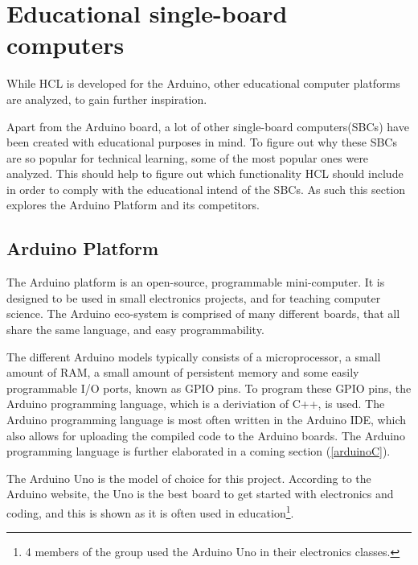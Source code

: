 \section{Educational single-board computers}
While HCL is developed for the Arduino, other educational computer platforms are analyzed, to gain further inspiration.

Apart from the Arduino board, a lot of other single-board computers(SBCs) have been created with educational purposes in mind.
To figure out why these SBCs are so popular for technical learning, some of the most popular ones were analyzed.
This should help to figure out which functionality HCL should include in order to comply with the educational intend of the SBCs\cite{SBC}.
As such this section explores the Arduino Platform and its competitors.

\subsection{Arduino Platform}
The Arduino platform is an open-source, programmable mini-computer\cite{ArFAQ}.
It is designed to be used in small electronics projects, and for teaching computer science.
The Arduino eco-system is comprised of many different boards, that all share the same language, and easy programmability.

The different Arduino models typically consists of a microprocessor, a small amount of RAM, a small amount of persistent memory and some easily programmable I/O ports, known as GPIO pins.
To program these GPIO pins, the Arduino programming language, which is a deriviation of C++, is used.
The Arduino programming language is most often written in the Arduino IDE, which also allows for uploading the compiled code to the Arduino boards.
The Arduino programming language is further elaborated in a coming section (\ref{arduinoC}).

The Arduino Uno is the model of choice for this project.
According to the Arduino website, the Uno is the best board to get started with electronics and coding, and this is shown as it is often used in education\footnote{4 members of the group used the Arduino Uno in their electronics classes.}\cite{ArduinoUno}.

